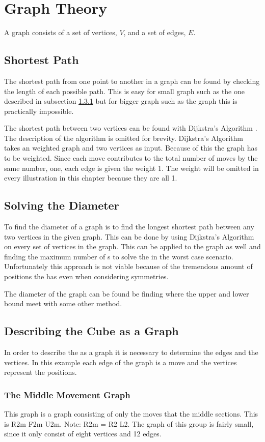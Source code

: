 \chapter {Graph Theory}
\label{chap:graphTheory}

A graph consists of a set of vertices, $V$, and a set of edges, $E$.

\section{Shortest Path}
The shortest path from one point to another in a graph can be found by checking the length of each possible path. This is easy for small graph such as the one described in subsection \ref{sub:middleMoveGroup} but for bigger graph such as the \rubik{} graph this is practically impossible. 

The shortest path between two vertices can be found with Dijkstra's Algorithm \cite[p. 651]{Rosen07}. The description of the algorithm is omitted for brevity. Dijkstra's Algorithm takes an weighted graph and two vertices as input. Because of this the \rubik{} graph has to be weighted. Since each move contributes to the total number of moves by the same number, one, each edge is given the weight 1. The weight will be omitted in every illustration in this chapter because they are all 1.  

\section{Solving the Diameter}
To find the diameter of a graph is to find the longest shortest path between any two vertices in the given graph. This can be done by using Dijkstra's Algorithm on every set of vertices in the graph. This can be applied to the \rubik{} graph as well and finding the maximum number of \twist{}s to solve the \rubik{} in the worst case scenario. Unfortunately this approach is not viable because of the tremendous amount of positions the \rubik{} has even when considering symmetries.

The diameter of the \rubik{} graph can be found be finding where the upper and lower bound meet with some other method.

\section{Describing the Cube as a Graph}
In order to describe the \rubik{} as a graph it is necessary to determine the edges and the vertices. In this example each edge of the graph is a move and the vertices represent the positions.  



\subsection{The Middle Movement Graph}
\label{sub:middleMoveGroup}
This graph is a \rubik{} graph consisting of only the moves that \twist{} the middle sections. This is R2m F2m U2m. Note: R2m = R2 L2.  The graph of this group is fairly small, since it only consist of eight vertices and 12 edges. 